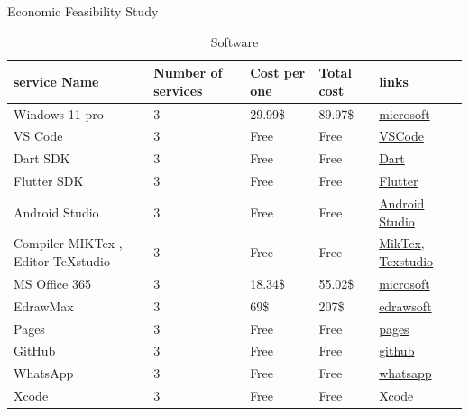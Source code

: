 \documentclass[12pt]{article}
\begin{document}
				\begin{table}[!h]
					\centering
					\caption{Economic Feasibility Study}
					\begin{subtable}{\textwidth}
						\centering
						\caption{Software}
						\begin{tabular}{|p{3.4cm}|p{2.1cm}|p{2cm}|p{1.5cm}|p{1.5cm}|}
							
							\hline
							\rowcolor{lightgray}
						 	\textbf{service Name} & \textbf{Number of services} & \textbf{Cost per one} & \textbf{Total cost} & \textbf{links}\\
						 	\hline
						 	Windows 11 pro& 3 & 29.99\$ & 89.97\$ & \href{https://instantlegit.com/product/microsoft-windows-11-professional-win-11-pro-license-code-key-original-new/}{microsoft}\\
						 	\hline
						 	VS Code & 3 & Free & Free & \href{https://code.visualstudio.com/}{VSCode} \\
						 	\hline
						 	Dart SDK & 3 & Free & Free & \href{https://dart.dev/get-dart}{Dart}\\
						 	\hline
						 	Flutter SDK & 3 & Free & Free & \href{https://docs.flutter.dev/get-started/install}{Flutter}\\
						 	\hline
						 	Android Studio & 3 & Free & Free & \href{https://developer.android.com/studio?gclid=CjwKCAiA2L-dBhACEiwAu8Q9YPOXet45HbMjGcjlZae74qH_Gq85oXOyydm8-tyNoXUi6DiOTKbEmRoC7FYQAvD_BwE&gclsrc=aw.ds}{Android Studio}\\
						 	\hline
						 	Compiler MIKTex , Editor TeXstudio & 3 & Free & Free &\href{http://www.miktex.com/}{MikTex}, \href{https://www.texstudio.org/}{Texstudio}\\
						 	\hline
						 	MS Office 365 & 3 & 18.34\$ & 55.02\$ & \href{https://www.microsoft.com/en-us/}{microsoft} \\
						 	\hline
						 	EdrawMax & 3 & 69\$ & 207\$ & \href{https://www.edrawsoft.com/pricing-edrawmax.html}{edrawsoft}\\
						 	\hline
						 	Pages & 3 & Free & Free & \href{https://www.apple.com/pages/}{pages}\\
						 	\hline
						 	GitHub & 3 & Free & Free & \href{https://github.com/}{github}\\
						 	\hline
						 	WhatsApp & 3 & Free & Free & \href{https://web.whatsapp.com/}{whatsapp}\\
						 	\hline
						 	Xcode & 3 & Free & Free & \href{https://developer.apple.com/xcode/}{Xcode}\\
						 	\hline

\end{tabular}
\end{subtable}
\end{table}
\end{document}
